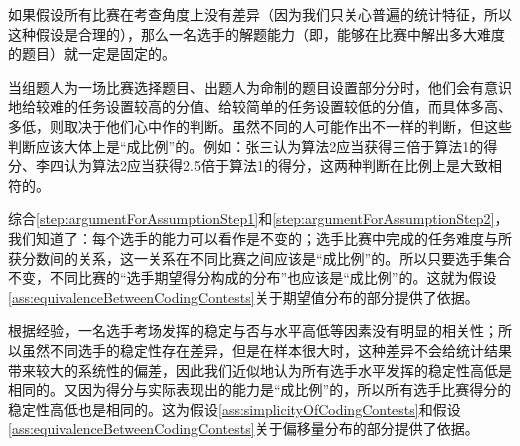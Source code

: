         \begin{asparaenum}
            \item \label{step:argumentForAssumptionStep1} 如果假设所有比赛在考查角度上没有差异（因为我们只关心普遍的统计特征，所以这种假设是合理的），那么一名选手的解题能力（即，能够在比赛中解出多大难度的题目）就一定是固定的。
            \item \label{step:argumentForAssumptionStep2} 当组题人为一场比赛选择题目、出题人为命制的题目设置部分分时，他们会有意识地给较难的任务设置较高的分值、给较简单的任务设置较低的分值，而具体多高、多低，则取决于他们心中作的判断。虽然不同的人可能作出不一样的判断，但这些判断应该大体上是“成比例”的。例如：张三认为算法2应当获得三倍于算法1的得分、李四认为算法2应当获得2.5倍于算法1的得分，这两种判断在比例上是大致相符的。
            \item 综合\ref{step:argumentForAssumptionStep1}和\ref{step:argumentForAssumptionStep2}，我们知道了：每个选手的能力可以看作是不变的；选手比赛中完成的任务难度与所获分数间的关系，这一关系在不同比赛之间应该是“成比例”的。所以只要选手集合不变，不同比赛的“选手期望得分构成的分布”也应该是“成比例”的。这就为假设\ref{ass:equivalenceBetweenCodingContests}关于期望值分布的部分提供了依据。
            \item 根据经验，一名选手考场发挥的稳定与否与水平高低等因素没有明显的相关性；所以虽然不同选手的稳定性存在差异，但是在样本很大时，这种差异不会给统计结果带来较大的系统性的偏差，因此我们近似地认为所有选手水平发挥的稳定性高低是相同的。又因为得分与实际表现出的能力是“成比例”的，所以所有选手比赛得分的稳定性高低也是相同的。这为假设\ref{ass:simplicityOfCodingContests}和假设\ref{ass:equivalenceBetweenCodingContests}关于偏移量分布的部分提供了依据。
        \end{asparaenum}
